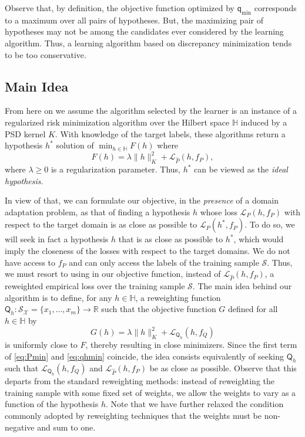 \documentclass[twoside,11pt]{article}
\def\Rset{\mathbb{R}}
\def\Hset{\mathbb{H}}
\newcommand{\h}{\widehat}
\newcommand{\set}[1]{\{#1\}}
\newcommand{\cL}{{\mathcal L}}
\newcommand{\cS}{{\mathcal S}}
\newcommand{\cX}{{\mathcal X}}
\newcommand{\1}{\mat{1}}
\newcommand{\qq}{{\mathsf q}}
\newcommand{\QQ}{{\mathsf Q}}
\newcommand{\qmin}{{\qq_\text{min}}}
\begin{document}
Observe that, by definition, the objective function optimized by
$\qmin$ corresponds to a maximum over all pairs of hypotheses. But,
the maximizing pair of hypotheses may not be among the candidates ever
considered by the learning algorithm. Thus, a learning algorithm based
on discrepancy minimization tends to be too conservative.

\subsection{Main Idea}
\label{sec:mainidea}

From here on we assume the algorithm selected by the learner is an
instance of a regularized risk minimization algorithm over the Hilbert
space $\Hset$ induced by a PSD kernel $K$. With knowledge of the
target labels, these algorithms return a hypothesis $h^*$ solution of
$\min_{h \in \Hset} F(h)$ where
\begin{equation}
\label{eq:Pmin}
F(h) = \lambda \| h \|_K^2 + \cL_{\h P} (h, f_P),
\end{equation}
where $\lambda \geq 0$ is a regularization parameter.  Thus, $h^*$ can
be viewed as the \emph{ideal hypothesis}.

In view of that, we can formulate our objective, in the
\emph{presence} of a domain adaptation problem, as that of finding a
hypothesis $h$ whose loss $\cL_P(h, f_P)$ with respect to the target
domain is as close as possible to $\cL_P(h^*, f_P)$. To do so, we will
seek in fact a hypothesis $h$ that is as close as possible to $h^*$,
which would imply the closeness of the losses with respect to the
target domains.  We do not have access to $f_P$ and can only access
the labels of the training sample $\cS$. Thus, we must resort to using
in our objective function, instead of $\cL_{\h P} (h, f_P)$, a
reweighted empirical loss over the training sample $\cS$.  The main
idea behind our algorithm is to define, for any $h \in \Hset$, a
reweighting function
$\QQ_h\colon \cS_\cX = \set{x_1, \ldots, x_m} \to \Rset$ such that the
objective function $G$ defined for all $h \in \Hset$ by
\begin{equation}
\label{eq:qhmin}
 G(h) = \lambda \| h \|_K^2 + \cL_{\QQ_h} (h, f_Q)
\end{equation}
is uniformly close to $F$, thereby resulting in close
minimizers. Since the first term of \eqref{eq:Pmin} and
\eqref{eq:qhmin} coincide, the idea consists equivalently of seeking
$\QQ_h$ such that $\cL_{\QQ_h}(h, f_Q) $ and $\cL_{\h P}(h, f_P)$ be
as close as possible.  Observe that this departs from the standard
reweighting methods: instead of reweighting the training sample with
some fixed set of weights, we allow the weights to vary as a function
of the hypothesis $h$. Note that we have further relaxed the condition
commonly adopted by reweighting techniques that the weights must be
non-negative and sum to one.
\end{document}
